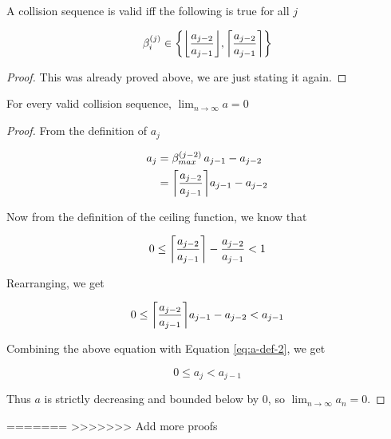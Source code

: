 
\begin{theorem}\label{thm:beta_i}
	A collision sequence is valid iff the following is true for all $j$

	\begin{equation}
		\beta^{(j)}_i \in \cbracket{\floor{\frac{a_{j-2}}{a_{j-1}}}, \ceil{\frac{a_{j-2}}{a_{j-1}}}}
	\end{equation}
\end{theorem}

\begin{proof}
	This was already proved above, we are just stating it again.
\end{proof}


\begin{theorem}
	For every valid collision sequence, $\lim_{n \to \infty} a = 0$
\end{theorem}

\begin{proof}
	From the definition of $a_j$

	\begin{align}\label{eq:a-def-2}
		a_j& = \beta^{(j-2)}_{max} \, a_{j-1} - a_{j-2}\\
		& =  \ceil{\frac{a_{j-2}}{a_{j-1}}} a_{j-1} - a_{j-2}
	\end{align}

	Now from the definition of the ceiling function, we know that

	\begin{equation}
		0 \le \ceil{\frac{a_{j-2}}{a_{j-1}}} - \frac{a_{j-2}}{a_{j-1}} < 1
	\end{equation}

	Rearranging, we get

	\begin{equation}
		0 \le \ceil{\frac{a_{j-2}}{a_{j-1}}} a_{j-1} - a_{j-2} < a_{j-1}
	\end{equation}

	Combining the above equation with Equation \ref{eq:a-def-2}, we get

	\begin{equation}
		0 \le a_j < a_{j-1}
	\end{equation}

	Thus $a$ is strictly decreasing and bounded below by 0, so $\lim_{n \to \infty} a_n = 0$.
\end{proof}
=======
>>>>>>> Add more proofs
